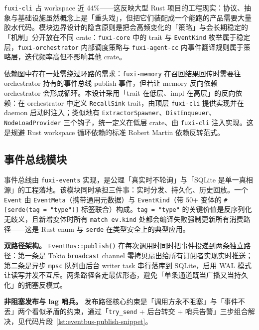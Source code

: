 \texttt{fuxi-cli} 占 workspace 近 44\%——这反映大型 Rust 项目的工程现实：协议、抽象与基础设施虽然概念上是「重头戏」，但把它们装配成一个能跑的产品需要大量胶水代码。模块边界设计的隐含原则是把会高频变化的「策略」与会长期稳定的「机制」分开放在不同 crate：\texttt{fuxi-core} 中的 trait 与 \texttt{EventKind} 枚举属于稳定层，\texttt{fuxi-orchestrator} 内部调度策略与 \texttt{fuxi-agent-cc} 内事件翻译规则属于策略层，迭代频率高但不影响其他 crate。

依赖图中存在一处需绕过环路的需求：\texttt{fuxi-memory} 在召回结果回传时需要往 orchestrator 持有的事件总线 publish 事件，但若让 memory 反向依赖 orchestrator 会形成循环。本设计采用「trait 在低层、impl 在高层」的反向依赖：在 orchestrator 中定义 \texttt{RecallSink} trait，由顶层 \texttt{fuxi-cli} 提供实现并在 daemon 启动时注入；类似地有 \texttt{ExtractorSpawner}、\texttt{DistEnqueuer}、\texttt{NodeLoadProvider} 三个钩子，统一定义在低层 crate、由 \texttt{fuxi-cli} 注入实现。这是规避 Rust workspace 循环依赖的标准 Robert Martin 依赖反转范式。

\subsection{事件总线模块}
\label{subsec:eventbus}

事件总线由 \texttt{fuxi-events} 实现，是公理「真实时不轮询」与「SQLite 是单一真相源」的工程落地。该模块同时承担三件事：实时分发、持久化、历史回放。一个 \texttt{Event} 由 \texttt{EventMeta}（携带通用元数据）与 \texttt{EventKind}（带 50+ 变体的 \texttt{\#[serde(tag = "type")]} 标签联合）构成。\texttt{tag = "type"} 的关键价值是反序列化无歧义，且新增变体时所有 \texttt{match ev.kind} 处都会编译失败强制更新所有消费路径——这是 Rust enum 与 \texttt{serde} 在类型安全上的典型应用。

\textbf{双路径架构。} \texttt{EventBus::publish()} 在每次调用时同时把事件投递到两条独立路径：第一条是 Tokio \texttt{broadcast} channel\parencite{tokio2024broadcast} 零拷贝扇出给所有订阅者实现实时推送；第二条是异步 \texttt{mpsc} 队列由后台 writer task 串行落库到 SQLite，启用 WAL 模式\parencite{sqlite2024wal} 让读写并发不互斥。两条路径各走最优形态，避免「单条通道既当广播又当持久化」的拥塞反模式。

\textbf{非阻塞发布与 lag 哨兵。} 发布路径核心约束是「调用方永不阻塞」与「事件不丢」两个看似矛盾的约束，通过「\texttt{try\_send} + 后台转交 + 哨兵告警」三步组合解决，见代码片段~\ref{lst:eventbus-publish-snippet}。

